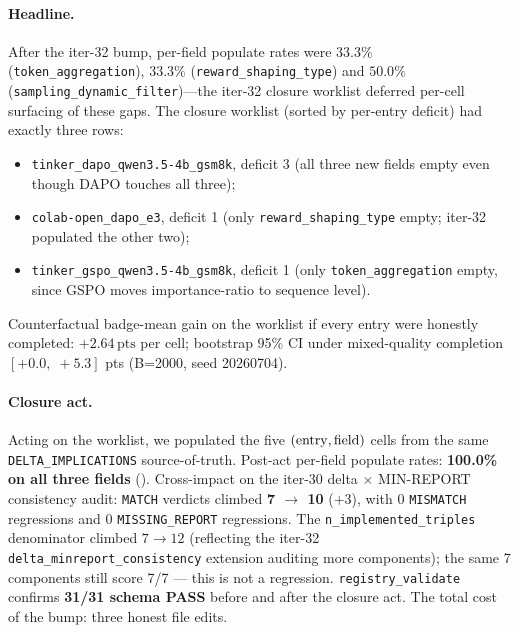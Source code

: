 \paragraph{Headline.}
After the iter-32 bump, per-field populate rates were
$33.3\%$ (\texttt{token\_aggregation}), $33.3\%$
(\texttt{reward\_shaping\_type}) and $50.0\%$
(\texttt{sampling\_dynamic\_filter})---the iter-32 closure
worklist deferred per-cell surfacing of these gaps. The closure
worklist (sorted by per-entry deficit) had exactly three rows:
\begin{itemize}
\item \texttt{tinker\_dapo\_qwen3.5-4b\_gsm8k}, deficit 3 (all
      three new fields empty even though DAPO touches all three);
\item \texttt{colab-open\_dapo\_e3}, deficit 1 (only
      \texttt{reward\_shaping\_type} empty; iter-32 populated the
      other two);
\item \texttt{tinker\_gspo\_qwen3.5-4b\_gsm8k}, deficit 1
      (only \texttt{token\_aggregation} empty, since GSPO moves
      importance-ratio to sequence level).
\end{itemize}
Counterfactual badge-mean gain on the worklist if every entry
were honestly completed: $+2.64\,\mathrm{pts}$ per cell;
bootstrap 95\% CI under mixed-quality completion $[+0.0,\;+5.3]$
pts (B=2000, seed 20260704).

\paragraph{Closure act.}
Acting on the worklist, we populated the five $({\rm entry},
{\rm field})$ cells from the same
\texttt{DELTA\_IMPLICATIONS} source-of-truth. Post-act per-field
populate rates: \textbf{100.0\% on all three fields}
(). Cross-impact on the iter-30
delta $\times$ MIN-REPORT consistency audit:
\texttt{MATCH} verdicts climbed \textbf{7 $\to$ 10}
($+3$), with $0$ \texttt{MISMATCH} regressions and $0$
\texttt{MISSING\_REPORT} regressions. The
\texttt{n\_implemented\_triples} denominator climbed $7\to12$
(reflecting the iter-32 \texttt{delta\_minreport\_consistency}
extension auditing more components); the same 7 components still
score 7/7 --- this is not a regression. \texttt{registry\_validate}
confirms \textbf{31/31 schema PASS} before and after the closure
act. The total cost of the bump: three honest file edits.

